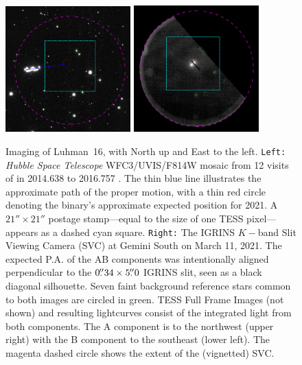 \documentclass[modern]{aastex631}
\begin{document}
\begin{figure}[ht]
  \centering
    \includegraphics[width=1.9in]{figures/DS9_HST_zoom_in_matched.png}
    \includegraphics[width=1.9in]{figures/DS9_IGRINS_SVC_zoom_in.png} \\
\caption{Imaging of Luhman~16, with North up and East to the left.  \texttt{Left:} \emph{Hubble Space Telescope} WFC3/UVIS/F814W mosaic from 12 visits of in 2014.638 to 2016.757 \citep{2017MNRAS.470.1140B}.  The thin blue line illustrates the approximate path of the proper motion, with a thin red circle denoting the binary's approximate expected position for 2021. A $21'' \times 21''$ postage stamp---equal to the size of one TESS pixel---appears as a dashed cyan square.  \texttt{Right:} The IGRINS $K-$band Slit Viewing Camera (SVC) at Gemini South on March 11, 2021.  The expected P.A. of the AB components was intentionally aligned perpendicular to the $0\mbox{$.\!\!^{\prime\prime}$}34 \times 5\mbox{$.\!\!^{\prime\prime}$}0$ IGRINS slit, seen as a black diagonal silhouette. Seven faint background reference stars common to both images are circled in green.  TESS Full Frame Images (not shown) and resulting lightcurves consist of the integrated light from both components.  The A component is to the northwest (upper right) with the B component to the southeast (lower left).  The magenta dashed circle shows the extent of the (vignetted) SVC.}
\label{fig:imaging}
\end{figure}


\end{document}
